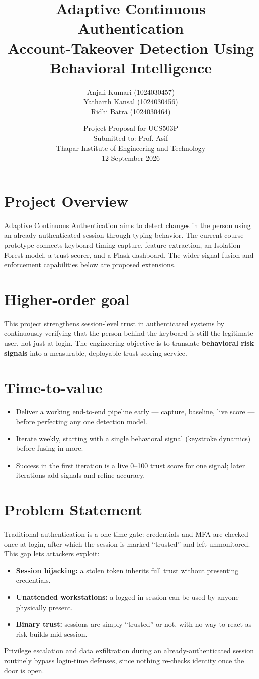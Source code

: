\documentclass[11pt,a4paper]{article}
\title{\textbf{Adaptive Continuous Authentication}\\[0.5em]\large Account-Takeover Detection Using Behavioral Intelligence}
\author{Anjali Kumari (1024030457)\\Yatharth Kansal (1024030456)\\Ridhi Batra (1024030464)}
\date{Project Proposal for UCS503P\\Submitted to: Prof. Asif\\Thapar Institute of Engineering and Technology\\12 September 2026}
\begin{document}
\maketitle

\section*{Project Overview}
Adaptive Continuous Authentication aims to detect changes in the person using an already-authenticated session through typing behavior. The current course prototype connects keyboard timing capture, feature extraction, an Isolation Forest model, a trust scorer, and a Flask dashboard. The wider signal-fusion and enforcement capabilities below are proposed extensions.

\section{Higher-order goal}
This project strengthens session-level trust in authenticated systems
by continuously verifying that the person behind the keyboard is
still the legitimate user, not just at login. The engineering
objective is to translate \textbf{behavioral risk signals} into a
measurable, deployable trust-scoring service.

\section{Time-to-value }
\begin{itemize}
    \item Deliver a working end-to-end pipeline early --- capture, baseline, live score --- before perfecting any one detection model.
    \item Iterate weekly, starting with a single behavioral signal (keystroke dynamics) before fusing in more.
    \item Success in the first iteration is a live 0--100 trust score for one signal; later iterations add signals and refine accuracy.
\end{itemize}

\section{Problem Statement}
Traditional authentication is a one-time gate: credentials and MFA
are checked once at login, after which the session is marked
``trusted'' and left unmonitored. This gap lets attackers exploit:
\begin{itemize}
    \item \textbf{Session hijacking:} a stolen token inherits full trust without presenting credentials.
    \item \textbf{Unattended workstations:} a logged-in session can be used by anyone physically present.
    \item \textbf{Binary trust:} sessions are simply ``trusted'' or not, with no way to react as risk builds mid-session.
\end{itemize}
Privilege escalation and data exfiltration during an already-authenticated
session routinely bypass login-time defenses, since nothing re-checks
identity once the door is open.
\end{document}
